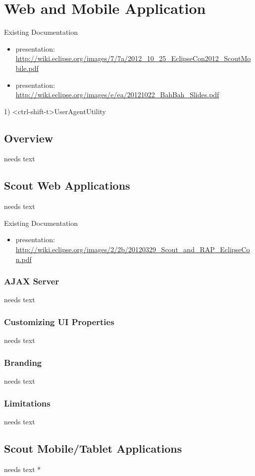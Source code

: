 \documentclass[a4paper,10pt,twoside]{book}
\begin{document}
  \sloppy
\fi


\chapter{Web and Mobile Application}

\noindent Existing Documentation
\begin{itemize}
  \item presentation: \url{http://wiki.eclipse.org/images/7/7a/2012_10_25_EclipseCon2012_ScoutMobile.pdf}
  \item presentation: \url{http://wiki.eclipse.org/images/e/ea/20121022_BahBah_Slides.pdf}
\end{itemize}

1) <ctrl-shift-t>UserAgentUtility

\section{Overview}
needs text

\section{Scout Web Applications}
needs text

\noindent Existing Documentation
\begin{itemize}
  \item presentation: \url{http://wiki.eclipse.org/images/2/2b/20120329_Scout_and_RAP_EclipseCon.pdf}
\end{itemize}

\subsection{AJAX Server}
needs text

\subsection{Customizing UI Properties}
needs text

\subsection{Branding}
needs text

\subsection{Limitations}
needs text

  
\section{Scout Mobile/Tablet Applications}
needs text
  * 
  

\ifx\wholebook\relax\else
   
   
\end{document}
